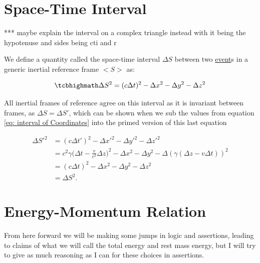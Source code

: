 \section{Space-Time Interval}

*** maybe explain the interval on a complex triangle instead with it being the hypotenuse and sides being cti and r

We define a quantity called the space-time interval $\Delta S$ between two \hyperlink{def-event}{event}s in a generic inertial reference frame ${<\!\!S\!>}$ as:

\begin{equation}
	\mhl{
		\Delta S^2 = (c\Delta t)^2 -\Delta x^2 -\Delta y^2 -\Delta z^2
	}
	\label{eq: space-time interval}
\end{equation}

All inertial frames of reference agree on this interval as it is invariant between frames, as $\Delta S=\Delta S{'}$, which can be shown when we sub the values from equation \eqref{eq: interval of Coordinates} into the primed version of this last equation

\begin{equation}
	\begin{aligned}
		\Delta S{'}^2 & = (c\Delta t{'})^2 -\Delta x{'}^2 -\Delta y{'}^2 -\Delta z{'}^2                                                                            \\
		            & = c^2{\gamma} \bigg( \Delta t-\frac{v}{c^2} \Delta z \bigg)^2 -\Delta x^2 -\Delta y^2 -\Delta ({\gamma} ( \Delta z-v \Delta t) )^2 \\
		            & = (c\Delta t)^2 -\Delta x^2 -\Delta y^2 -\Delta z^2                                                                                \\
		            & = \Delta S^2.
	\end{aligned}
\end{equation}

\section{Energy-Momentum Relation}

From here forward we will be making some jumps in logic and assertions, leading to claims of what we will call the total energy and rest mass energy, but I will try to give as much reasoning as I can for these choices in assertions.

